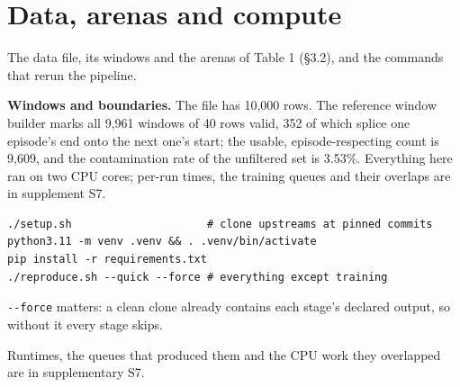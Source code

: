 \documentclass[10pt]{article}
\begin{document}
\begin{center}\small{}\end{center}

\section{Data, arenas and compute}

The data file, its windows and the arenas of Table 1 (\S{}3.2), and the commands that rerun the pipeline.

\textbf{Windows and boundaries.} The file has 10,000 rows. The reference window builder marks all 9,961 windows of 40 rows valid, 352 of which splice one episode's end onto the next one's start; the usable, episode-respecting count is 9,609, and the contamination rate of the unfiltered set is 3.53\%. Everything here ran on two CPU cores; per-run times, the training queues and their overlaps are in supplement S7.

\begin{verbatim}
./setup.sh                     # clone upstreams at pinned commits
python3.11 -m venv .venv && . .venv/bin/activate
pip install -r requirements.txt
./reproduce.sh --quick --force # everything except training
\end{verbatim}
\texttt{-{}-force} matters: a clean clone already contains each stage's declared output, so without it every stage skips.

Runtimes, the queues that produced them and the CPU work they overlapped are in supplementary S7.
\end{document}
